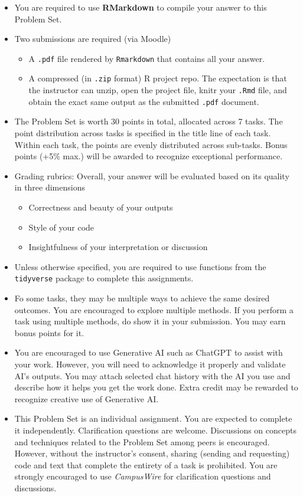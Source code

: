 \documentclass[
]{article}
\begin{document}
\begin{itemize}
\item
  You are required to use \textbf{RMarkdown} to compile your answer to
  this Problem Set.
\item
  Two submissions are required (via Moodle)

  \begin{itemize}
  \item
    A \texttt{.pdf} file rendered by \texttt{Rmarkdown} that contains
    all your answer.
  \item
    A compressed (in \texttt{.zip} format) R project repo. The
    expectation is that the instructor can unzip, open the project file,
    knitr your \texttt{.Rmd} file, and obtain the exact same output as
    the submitted \texttt{.pdf} document.
  \end{itemize}
\item
  The Problem Set is worth 30 points in total, allocated across 7 tasks.
  The point distribution across tasks is specified in the title line of
  each task. Within each task, the points are evenly distributed across
  sub-tasks. Bonus points (+5\% max.) will be awarded to recognize
  exceptional performance.
\item
  Grading rubrics: Overall, your answer will be evaluated based on its
  quality in three dimensions

  \begin{itemize}
  \item
    Correctness and beauty of your outputs
  \item
    Style of your code
  \item
    Insightfulness of your interpretation or discussion
  \end{itemize}
\item
  Unless otherwise specified, you are required to use functions from the
  \texttt{tidyverse} package to complete this assignments.
\item
  Fo some tasks, they may be multiple ways to achieve the same desired
  outcomes. You are encouraged to explore multiple methods. If you
  perform a task using multiple methods, do show it in your submission.
  You may earn bonus points for it.
\item
  You are encouraged to use Generative AI such as ChatGPT to assist with
  your work. However, you will need to acknowledge it properly and
  validate AI's outputs. You may attach selected chat history with the
  AI you use and describe how it helps you get the work done. Extra
  credit may be rewarded to recognize creative use of Generative AI.
\item
  This Problem Set is an individual assignment. You are expected to
  complete it independently. Clarification questions are welcome.
  Discussions on concepts and techniques related to the Problem Set
  among peers is encouraged. However, without the instructor's consent,
  sharing (sending and requesting) code and text that complete the
  entirety of a task is prohibited. You are strongly encouraged to use
  \emph{CampusWire} for clarification questions and discussions.
\end{itemize}
\end{document}
